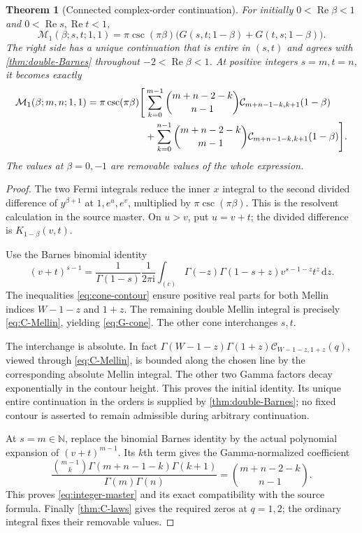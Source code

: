 \documentclass[11pt]{article}
\numberwithin{equation}{section}
\newtheorem{theorem}{Theorem}[section]
\theoremstyle{definition}
\DeclareMathOperator{\Rea}{Re}
\newcommand{\N}{\mathbb N}
\newcommand{\dd}{\,\mathrm d}
\newcommand{\ii}{\mathrm i}
\newcommand{\CC}{\mathcal C}
\newcommand{\MM}{\mathcal M}
\begin{document}
\begin{theorem}[Connected complex-order continuation]\label{thm:connected-spectral}
For initially $0<\Rea\beta<1$ and $0<\Rea s,\Rea t<1$,
\begin{equation}\label{eq:connected-master}
 \MM_1(\beta;s,t;1,1)=\pi\csc(\pi\beta)
 \bigl(G(s,t;1-\beta)+G(t,s;1-\beta)\bigr).
\end{equation}
The right side has a unique continuation that is entire in $(s,t)$ and agrees with \cref{thm:double-Barnes} throughout $-2<\Rea\beta<1$. At positive integers $s=m,t=n$, it becomes exactly
\begin{align}\label{eq:integer-master}
 \MM_1(\beta;m,n;1,1)=\pi\csc(\pi\beta)
 \Bigg[&\sum_{k=0}^{m-1}\binom{m+n-2-k}{n-1}
 \CC_{m+n-1-k,k+1}(1-\beta)\\
 &+\sum_{k=0}^{n-1}\binom{m+n-2-k}{m-1}
 \CC_{m+n-1-k,k+1}(1-\beta)\Bigg].\notag
\end{align}
The values at $\beta=0,-1$ are removable values of the \emph{whole} expression.
\end{theorem}
\begin{proof}
The two Fermi integrals reduce the inner $x$ integral to the second divided difference of $y^{\beta+1}$ at $1,e^u,e^v$, multiplied by $\pi\csc(\pi\beta)$. This is the resolvent calculation in the source master. On $u>v$, put $u=v+t$; the divided difference is $K_{1-\beta}(v,t)$.

Use the Barnes binomial identity
\[
 (v+t)^{s-1}=\frac1{\Gamma(1-s)}\frac1{2\pi\ii}
 \int_{(c)}\Gamma(-z)\Gamma(1-s+z)v^{s-1-z}t^z\dd z.
\]
The inequalities \eqref{eq:cone-contour} ensure positive real parts for both Mellin indices $W-1-z$ and $1+z$. The remaining double Mellin integral is precisely \eqref{eq:C-Mellin}, yielding \eqref{eq:G-cone}. The other cone interchanges $s,t$.

The interchange is absolute. In fact $\Gamma(W-1-z)\Gamma(1+z)\CC_{W-1-z,1+z}(q)$, viewed through \eqref{eq:C-Mellin}, is bounded along the chosen line by the corresponding absolute Mellin integral. The other two Gamma factors decay exponentially in the contour height. This proves the initial identity. Its unique entire continuation in the orders is supplied by \cref{thm:double-Barnes}; no fixed contour is asserted to remain admissible during arbitrary continuation.

At $s=m\in\N$, replace the binomial Barnes identity by the actual polynomial expansion of $(v+t)^{m-1}$. Its $k$th term gives the Gamma-normalized coefficient
\[
 \frac{\binom{m-1}{k}\Gamma(m+n-1-k)\Gamma(k+1)}{\Gamma(m)\Gamma(n)}
 =\binom{m+n-2-k}{n-1}.
\]
This proves \eqref{eq:integer-master} and its exact compatibility with the source formula. Finally \cref{thm:C-laws} gives the required zeros at $q=1,2$; the ordinary integral fixes their removable values.
\end{proof}
\end{document}

